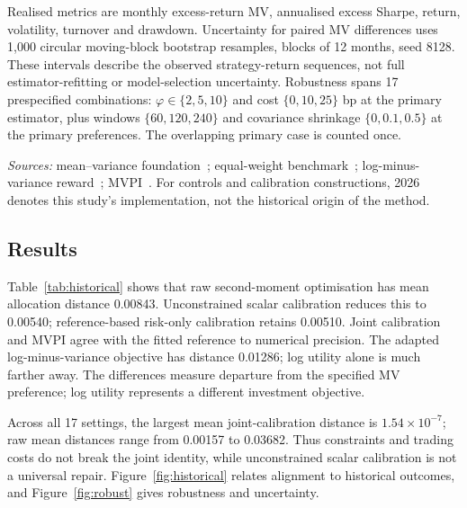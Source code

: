 \documentclass[sigconf,anonymous,review]{acmart}
\begin{document}
Realised metrics are monthly excess-return MV, annualised excess Sharpe, return, volatility, turnover and drawdown. Uncertainty for paired MV differences uses 1,000 circular moving-block bootstrap resamples, blocks of 12 months, seed 8128. These intervals describe the observed strategy-return sequences, not full estimator-refitting or model-selection uncertainty. Robustness spans 17 prespecified combinations: $\varphi\in\{2,5,10\}$ and cost $\{0,10,25\}$ bp at the primary estimator, plus windows $\{60,120,240\}$ and covariance shrinkage $\{0,0.1,0.5\}$ at the primary preferences. The overlapping primary case is counted once.

\begin{table}[t]
\centering
\caption{Reward-formulation comparison on historical data, 1990--2025. Published rewards are adapted to a common environment; complete published algorithms are not reproduced. Bold identifies our joint-calibration construction, not the best realised performance. Distance and fitted regret use common states; realised metrics use each strategy's own path. Gap and MV score are monthly basis-point units.}
\label{tab:historical}

\par\smallskip
\parbox{\textwidth}{\footnotesize\emph{Sources:} mean--variance foundation~\cite{markowitz1952}; equal-weight benchmark~\cite{demiguel2009}; log-minus-variance reward~\cite{jiang2025}; MVPI~\cite{zhang2021}. For controls and calibration constructions, 2026 denotes this study's implementation, not the historical origin of the method.}
\end{table}

\subsection{Results}
Table~\ref{tab:historical} shows that raw second-moment optimisation has mean allocation distance 0.00843. Unconstrained scalar calibration reduces this to 0.00540; reference-based risk-only calibration retains 0.00510. Joint calibration and MVPI agree with the fitted reference to numerical precision. The adapted log-minus-variance objective has distance 0.01286; log utility alone is much farther away. The differences measure departure from the specified MV preference; log utility represents a different investment objective.

Across all 17 settings, the largest mean joint-calibration distance is $1.54\times10^{-7}$; raw mean distances range from 0.00157 to 0.03682. Thus constraints and trading costs do not break the joint identity, while unconstrained scalar calibration is not a universal repair. Figure~\ref{fig:historical} relates alignment to historical outcomes, and Figure~\ref{fig:robust} gives robustness and uncertainty.
\end{document}
